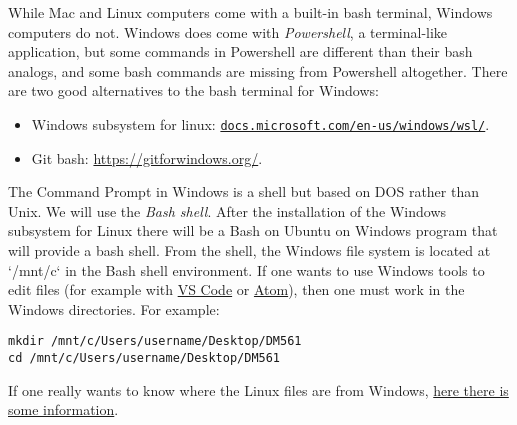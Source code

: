%
%
%
%



\begin{info}
While Mac and Linux computers come with a built-in bash terminal, Windows computers do not.
Windows does come with \emph{Powershell}, a terminal-like application, but some commands in Powershell are different than their bash analogs, and some bash commands are missing from Powershell altogether.
There are two good alternatives to the bash terminal for Windows:
\begin{itemize}
\item Windows subsystem for linux: \href{https://docs.microsoft.com/en-us/windows/wsl/install-win10}{\texttt{docs.microsoft.com/en-us/windows/wsl/}}.
\item Git bash: \url{https://gitforwindows.org/}.
\end{itemize}
\end{info}



The Command Prompt in Windows is a shell but based on DOS rather than
Unix.  We will use the \emph{Bash shell}. After the installation of the
Windows subsystem for Linux there will be a Bash on Ubuntu on Windows
program that will provide a bash shell. From the shell, the Windows file system is located
at `/mnt/c` in the Bash shell environment. If one wants to use Windows
tools to edit files (for example with
\href{https://code.visualstudio.com/}{VS Code} or
\href{https://atom.io/}{Atom}), then one must work in the Windows
directories. For example:

\begin{lstlisting}
mkdir /mnt/c/Users/username/Desktop/DM561
cd /mnt/c/Users/username/Desktop/DM561
\end{lstlisting}

If one really wants to know where the Linux files are from Windows,
\href{https://www.howtogeek.com/261383/how-to-access-your-ubuntu-bash-files-in-windows-and-your-windows-system-drive-in-bash/}{here there is some information}.



